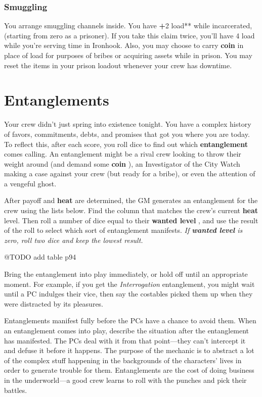\documentclass[11pt,oneside]{book}
\newcommand{\gameterm}[1]{\textbf{#1}}
\begin{document}
\subsection{Smuggling}

You arrange smuggling channels inside. You have \textbf{+}2 load** while incarcerated, (starting from zero as a prisoner). If you take this claim twice, you’ll have 4 load while you’re serving time in Ironhook. Also, you may choose to carry \gameterm{coin}  in place of load for purposes of bribes or acquiring assets while in prison. You may reset the items in your prison loadout whenever your crew has downtime.

\chapter{Entanglements}

Your crew didn’t just spring into existence tonight. You have a complex history of favors, commitments, debts, and promises that got you where you are today. To reflect this, after each score, you roll dice to find out which \textbf{entanglement} comes calling. An entanglement might be a rival crew looking to throw their weight around (and demand some \gameterm{coin} ), an Investigator of the City Watch making a case against your crew (but ready for a bribe), or even the attention of a vengeful ghost.

After payoff and \gameterm{heat}  are determined, the GM generates an entanglement for the crew using the lists below. Find the column that matches the crew’s current \gameterm{heat}  level. Then roll a number of dice equal to their \gameterm{wanted level} , and use the result of the roll to select which sort of entanglement manifests. \emph{If \gameterm{wanted level}  is zero, roll two dice and keep the lowest result.}

@TODO add table p94

Bring the entanglement into play immediately, or hold off until an appropriate moment. For example, if you get the \emph{Interrogation} entanglement, you might wait until a PC indulges their vice, then say the costables picked them up when they were distracted by its pleasures.

Entanglements manifest fully before the PCs have a chance to avoid them. When an entanglement comes into play, describe the situation after the entanglement has manifested. The PCs deal with it from that point---they can’t intercept it and defuse it before it happens. The purpose of the mechanic is to abstract a lot of the complex stuff happening in the backgrounds of the characters’ lives in order to generate trouble for them. Entanglements are the cost of doing business in the underworld---a good crew learns to roll with the punches and pick their battles.
\end{document}
